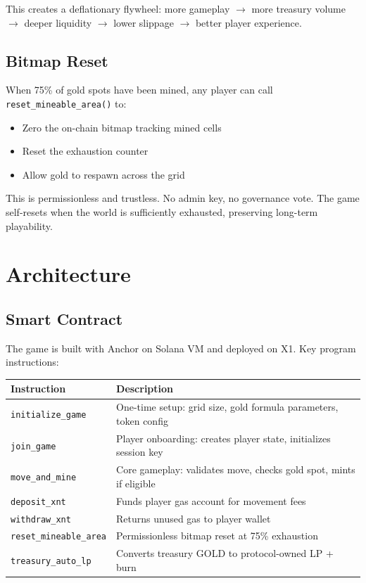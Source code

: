 \documentclass[11pt,a4paper]{article}
\begin{document}
This creates a deflationary flywheel: more gameplay $\rightarrow$ more treasury volume $\rightarrow$ deeper liquidity $\rightarrow$ lower slippage $\rightarrow$ better player experience.

\subsection{Bitmap Reset}

When 75\% of gold spots have been mined, any player can call \texttt{reset\_mineable\_area()} to:

\begin{itemize}[leftmargin=2em]
\item Zero the on-chain bitmap tracking mined cells
\item Reset the exhaustion counter
\item Allow gold to respawn across the grid
\end{itemize}

This is permissionless and trustless. No admin key, no governance vote. The game self-resets when the world is sufficiently exhausted, preserving long-term playability.

\section{Architecture}

\subsection{Smart Contract}

The game is built with Anchor on Solana VM and deployed on X1. Key program instructions:

\begin{table}[h]
\centering
\begin{tabular}{@{}lp{8cm}@{}}
\toprule
Instruction & Description \\
\midrule
\texttt{initialize\_game} & One-time setup: grid size, gold formula parameters, token config \\
\texttt{join\_game} & Player onboarding: creates player state, initializes session key \\
\texttt{move\_and\_mine} & Core gameplay: validates move, checks gold spot, mints if eligible \\
\texttt{deposit\_xnt} & Funds player gas account for movement fees \\
\texttt{withdraw\_xnt} & Returns unused gas to player wallet \\
\texttt{reset\_mineable\_area} & Permissionless bitmap reset at 75\% exhaustion \\
\texttt{treasury\_auto\_lp} & Converts treasury GOLD to protocol-owned LP + burn \\
\bottomrule
\end{tabular}
\end{table}
\end{document}
